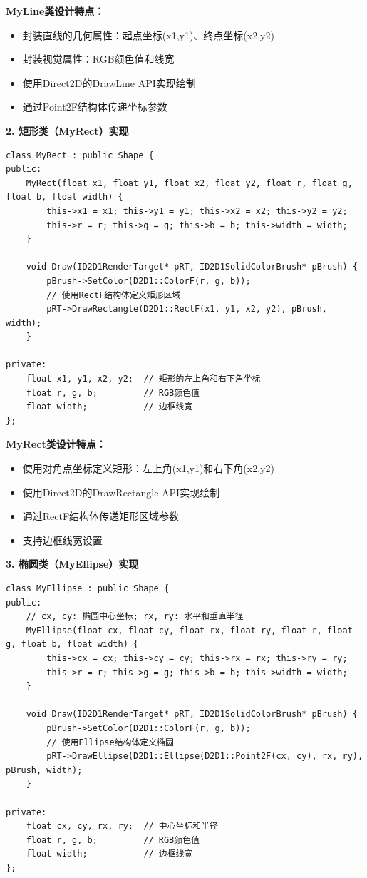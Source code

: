 \documentclass[12pt,a4paper]{article}
\begin{document}
\textbf{MyLine类设计特点：}
\begin{itemize}
    \item 封装直线的几何属性：起点坐标(x1,y1)、终点坐标(x2,y2)
    \item 封装视觉属性：RGB颜色值和线宽
    \item 使用Direct2D的DrawLine API实现绘制
    \item 通过Point2F结构体传递坐标参数
\end{itemize}

\textbf{2. 矩形类（MyRect）实现}

\begin{lstlisting}[caption=矩形类实现]
class MyRect : public Shape {
public:
    MyRect(float x1, float y1, float x2, float y2, float r, float g, float b, float width) {
        this->x1 = x1; this->y1 = y1; this->x2 = x2; this->y2 = y2;
        this->r = r; this->g = g; this->b = b; this->width = width;
    }

    void Draw(ID2D1RenderTarget* pRT, ID2D1SolidColorBrush* pBrush) {
        pBrush->SetColor(D2D1::ColorF(r, g, b));
        // 使用RectF结构体定义矩形区域
        pRT->DrawRectangle(D2D1::RectF(x1, y1, x2, y2), pBrush, width);
    }

private:
    float x1, y1, x2, y2;  // 矩形的左上角和右下角坐标
    float r, g, b;         // RGB颜色值
    float width;           // 边框线宽
};
\end{lstlisting}

\textbf{MyRect类设计特点：}
\begin{itemize}
    \item 使用对角点坐标定义矩形：左上角(x1,y1)和右下角(x2,y2)
    \item 使用Direct2D的DrawRectangle API实现绘制
    \item 通过RectF结构体传递矩形区域参数
    \item 支持边框线宽设置
\end{itemize}

\textbf{3. 椭圆类（MyEllipse）实现}

\begin{lstlisting}[caption=椭圆类实现]
class MyEllipse : public Shape {
public:
    // cx, cy: 椭圆中心坐标; rx, ry: 水平和垂直半径
    MyEllipse(float cx, float cy, float rx, float ry, float r, float g, float b, float width) {
        this->cx = cx; this->cy = cy; this->rx = rx; this->ry = ry;
        this->r = r; this->g = g; this->b = b; this->width = width;
    }

    void Draw(ID2D1RenderTarget* pRT, ID2D1SolidColorBrush* pBrush) {
        pBrush->SetColor(D2D1::ColorF(r, g, b));
        // 使用Ellipse结构体定义椭圆
        pRT->DrawEllipse(D2D1::Ellipse(D2D1::Point2F(cx, cy), rx, ry), pBrush, width);
    }

private:
    float cx, cy, rx, ry;  // 中心坐标和半径
    float r, g, b;         // RGB颜色值
    float width;           // 边框线宽
};
\end{lstlisting}
\end{document}
